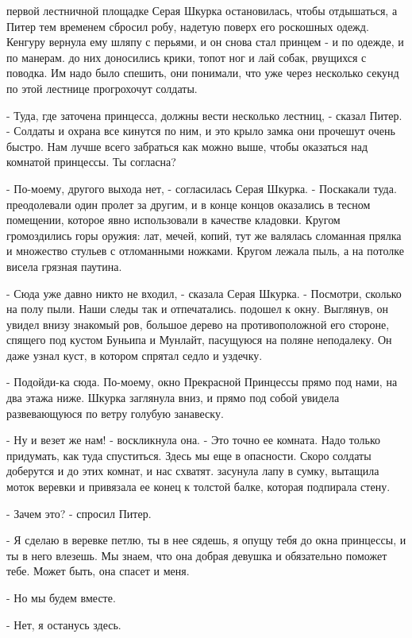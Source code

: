  первой лестничной площадке Серая Шкурка остановилась, чтобы 
отдышаться, а Питер тем временем сбросил робу, надетую поверх его 
роскошных одежд. Кенгуру вернула ему шляпу с перьями, и он снова стал 
принцем - и по одежде, и по манерам.
 до них доносились крики, топот ног и лай собак, рвущихся с 
поводка. Им надо было спешить, они понимали, что уже через несколько 
секунд по этой лестнице прогрохочут солдаты.
\par- Туда, где заточена принцесса, должны вести несколько лестниц, - 
сказал Питер. - Солдаты и охрана все кинутся по ним, и это крыло замка 
они прочешут очень быстро. Нам лучше всего забраться как можно выше, 
чтобы оказаться над комнатой принцессы. Ты согласна?
\par- По-моему, другого выхода нет, - согласилась Серая Шкурка. - 
Поскакали туда.
 преодолевали один пролет за другим, и в конце концов оказались 
в тесном помещении, которое явно использовали в качестве кладовки. 
Кругом громоздились горы оружия: лат, мечей, копий, тут же валялась 
сломанная прялка и множество стульев с отломанными ножками. Кругом 
лежала пыль, а на потолке висела грязная паутина.
\par- Сюда уже давно никто не входил, - сказала Серая Шкурка. - 
Посмотри, сколько на полу пыли. Наши следы так и отпечатались.
 подошел к окну. Выглянув, он увидел внизу знакомый ров, 
большое дерево на противоположной его стороне, спящего под кустом 
Буньипа и Мунлайт, пасущуюся на поляне неподалеку. Он даже узнал куст, 
в котором спрятал седло и уздечку.
\par- Подойди-ка сюда. По-моему, окно Прекрасной Принцессы прямо под 
нами, на два этажа ниже.
 Шкурка заглянула вниз, и прямо под собой увидела 
развевающуюся по ветру голубую занавеску.
\par- Ну и везет же нам! - воскликнула она. - Это точно ее комната. 
Надо только придумать, как туда спуститься. Здесь мы еще в опасности. 
Скоро солдаты доберутся и до этих комнат, и нас схватят.
 засунула лапу в сумку, вытащила моток веревки и привязала ее 
конец к толстой балке, которая подпирала стену.
\par- Зачем это? - спросил Питер.
\par- Я сделаю в веревке петлю, ты в нее сядешь, я опущу тебя до окна 
принцессы, и ты в него влезешь. Мы знаем, что она добрая девушка и 
обязательно поможет тебе. Может быть, она спасет и меня.
\par- Но мы будем вместе.
\par- Нет, я останусь здесь.

